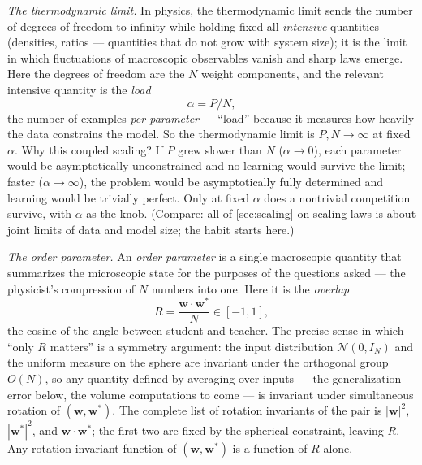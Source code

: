 \documentclass[11pt]{article}
\newcommand{\bv}[1]{\boldsymbol{#1}}
\begin{document}
\emph{The thermodynamic limit.} In physics, the thermodynamic limit sends
the number of degrees of freedom to infinity while holding fixed all
\emph{intensive} quantities (densities, ratios --- quantities that do not
grow with system size); it is the limit in which fluctuations of
macroscopic observables vanish and sharp laws emerge. Here the degrees of
freedom are the $N$ weight components, and the relevant intensive quantity
is the \emph{load}
\begin{equation}
  \label{eq:load}
  \alpha = P/N,
\end{equation}
the number of examples \emph{per parameter} --- ``load'' because it measures
how heavily the data constrains the model. So the thermodynamic limit is
$P, N \to \infty$ at fixed $\alpha$. Why this coupled scaling? If $P$ grew
slower than $N$ ($\alpha \to 0$), each parameter would be asymptotically
unconstrained and no learning would survive the limit; faster
($\alpha \to \infty$), the problem would be asymptotically fully determined
and learning would be trivially perfect. Only at fixed $\alpha$ does a
nontrivial competition survive, with $\alpha$ as the knob. (Compare: all of
\cref{sec:scaling} on scaling laws is about joint limits of data and model
size; the habit starts here.)

\emph{The order parameter.} An \emph{order parameter} is a single
macroscopic quantity that summarizes the microscopic state for the purposes
of the questions asked --- the physicist's compression of $N$ numbers into
one. Here it is the \emph{overlap}
\begin{equation}
  \label{eq:overlap}
  R = \frac{\bv{w}\cdot\bv{w}^{*}}{N} \in [-1, 1],
\end{equation}
the cosine of the angle between student and teacher. The precise sense in
which ``only $R$ matters'' is a symmetry argument: the input distribution
$\mathcal{N}(0, I_N)$ and the uniform measure on the sphere are invariant
under the orthogonal group $O(N)$, so any quantity defined by averaging
over inputs --- the generalization error below, the volume computations to
come --- is invariant under simultaneous rotation of $(\bv{w}, \bv{w}^*)$.
The complete list of rotation invariants of the pair is $|\bv{w}|^2$,
$|\bv{w}^*|^2$, and $\bv{w}\cdot\bv{w}^*$; the first two are fixed by the
spherical constraint, leaving $R$. Any rotation-invariant function of
$(\bv{w},\bv{w}^*)$ is a function of $R$ alone.
\end{document}
